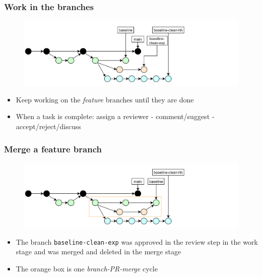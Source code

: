 \documentclass[aspectratio=169]{beamer} %
\begin{document}
\begin{frame}
	\frametitle{Work in the branches}

	\vspace{-.5cm}
	\begin{minipage}[t][5cm][t]{\textwidth}
		\begin{figure}
			\centering
			\includegraphics[width=\textwidth]{./img/dime-gitflow-network-2-3.png}
		\end{figure}
	\end{minipage}

	\vspace{-.5cm}
	\begin{minipage}[t][5cm][t]{\textwidth}
		\begin{itemize}
			\setlength\itemsep{.5em}
			\item Keep working on the \textit{feature} branches until they are done
			\item When a task is complete: assign a reviewer - comment/suggest - accept/reject/discuss
		\end{itemize}
	\end{minipage}
\end{frame}

\begin{frame}
	\frametitle{Merge a feature branch}

	\vspace{-.5cm}
	\begin{minipage}[t][5cm][t]{\textwidth}
		\begin{figure}
			\centering
			\includegraphics[width=\textwidth]{./img/dime-gitflow-network-2-4.png}
		\end{figure}
	\end{minipage}

	\vspace{-.5cm}
	\begin{minipage}[t][5cm][t]{\textwidth}
		\begin{itemize}
			\setlength\itemsep{.5em}
			\item The branch \texttt{baseline-clean-exp} was approved in the review step in the work stage and was merged and deleted in the merge stage
			\item The orange box is one \textit{branch-PR-merge} cycle
		\end{itemize}
	\end{minipage}
\end{frame}
\end{document}
